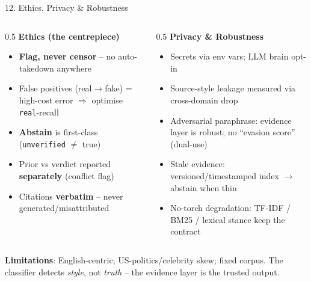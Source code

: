 \documentclass[10pt,aspectratio=169]{beamer}
\begin{document}
\begin{frame}{12. Ethics, Privacy \& Robustness}
\begin{columns}[T]
\begin{column}{0.5\textwidth}
\textbf{Ethics (the centrepiece)}
\begin{itemize}\small
  \item \textbf{Flag, never censor} -- no auto-takedown anywhere
  \item False positives (real$\rightarrow$fake) = high-cost error $\Rightarrow$ optimise \texttt{real}-recall
  \item \textbf{Abstain} is first-class (\texttt{unverified} $\neq$ true)
  \item Prior vs verdict reported \textbf{separately} (conflict flag)
  \item Citations \textbf{verbatim} -- never generated/misattributed
\end{itemize}
\end{column}
\begin{column}{0.5\textwidth}
\textbf{Privacy \& Robustness}
\begin{itemize}\small
  \item Secrets via env vars; LLM brain opt-in
  \item Source-style leakage measured via cross-domain drop
  \item Adversarial paraphrase: evidence layer is robust; no ``evasion score'' (dual-use)
  \item Stale evidence: versioned/timestamped index $\rightarrow$ abstain when thin
  \item No-torch degradation: TF-IDF / BM25 / lexical stance keep the contract
\end{itemize}
\end{column}
\end{columns}

\vspace{0.15cm}
\centering\small \textbf{Limitations}: English-centric; US-politics/celebrity skew; fixed corpus. The classifier detects \emph{style}, not \emph{truth} -- the evidence layer is the trusted output.
\end{frame}
\end{document}
